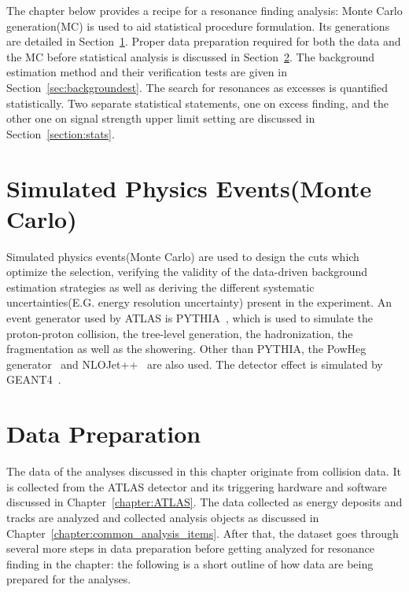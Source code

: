 The chapter below provides a recipe for a resonance finding analysis: Monte Carlo generation(MC) is used to aid statistical procedure formulation. Its generations are detailed in Section~\ref{sec:MC}. Proper data preparation required for both the data and the MC before statistical analysis is discussed in Section~\ref{sec:dataprep}. The background estimation method and their verification tests are given in Section~\ref{sec:backgroundest}. The search for resonances as excesses is quantified statistically. Two separate statistical statements, one on excess finding, and the other one on signal strength upper limit setting are discussed in Section~\ref{section:stats}. 

\section{Simulated Physics Events(Monte Carlo)}
\label{sec:MC}
Simulated physics events(Monte Carlo) are used to design the cuts which optimize the selection, verifying the validity of the data-driven background estimation strategies as well as deriving the different systematic uncertainties(E.G. energy resolution uncertainty) present in the experiment.
An event generator used by ATLAS is PYTHIA~\cite{PYTHIA}, which is used to simulate the proton-proton collision, the tree-level generation, the hadronization, the fragmentation as well as the showering. 
Other than PYTHIA, the PowHeg generator~\cite{oleari2010powheg} and NLOJet++~\cite{nagynlojet++} are also used. The detector effect is simulated by GEANT4~\cite{Agostinelli:602040}.



\section{Data Preparation}
\label{sec:dataprep}
The data of the analyses discussed in this chapter originate from collision data. It is collected from the ATLAS detector and its triggering hardware and software discussed in Chapter~\ref{chapter:ATLAS}. The data collected as energy deposits and tracks are analyzed and collected analysis objects as discussed in Chapter~\ref{chapter:common_analysis_items}. After that, the dataset goes through several more steps in data preparation before getting analyzed for resonance finding in the chapter: the following is a short outline of how data are being prepared for the analyses.

